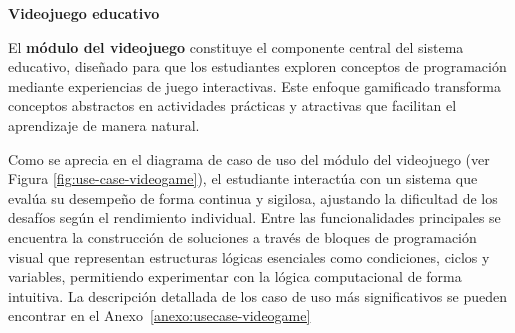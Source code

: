 %
%
%
%



\textbf{Videojuego educativo}

El \textbf{módulo del videojuego} constituye el componente central del sistema educativo, diseñado para que los estudiantes exploren conceptos de programación mediante experiencias de juego interactivas. Este enfoque gamificado transforma conceptos abstractos en actividades prácticas y atractivas que facilitan el aprendizaje de manera natural.

Como se aprecia en el diagrama de caso de uso del módulo del videojuego (ver Figura \ref{fig:use-case-videogame}), el estudiante interactúa con un sistema que evalúa su desempeño de forma continua y sigilosa, ajustando la dificultad de los desafíos según el rendimiento individual. Entre las funcionalidades principales se encuentra la construcción de soluciones a través de bloques de programación visual que representan estructuras lógicas esenciales como condiciones, ciclos y variables, permitiendo experimentar con la lógica computacional de forma intuitiva. La descripción detallada de los caso de uso más significativos se pueden encontrar en el Anexo~\ref{anexo:usecase-videogame}

